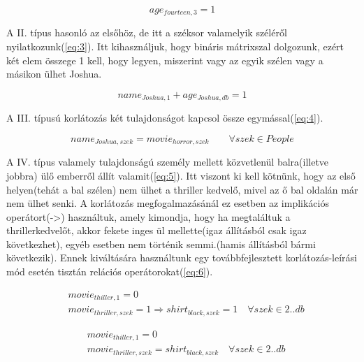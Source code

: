 \documentclass[12pt,a4paper]{report}
\begin{document}
    \begin{equation} \label{eq:2}
     age_ {fourteen,3}=1 
     \end{equation}

    A II. típus hasonló az elsőhöz, de itt a széksor valamelyik széléről nyilatkozunk(\ref{eq:3}).
    Itt kihasználjuk, hogy bináris mátrixszal dolgozunk, ezért két elem összege 1 kell, hogy legyen, miszerint vagy az egyik szélen vagy a másikon ülhet Joshua.

    \begin{equation}  \label{eq:3}
    name_{Joshua,1} + age_{Joshua,db} =1
    \end{equation}

    A III. típusú korlátozás két tulajdonságot kapcsol össze egymással(\ref{eq:4}).

    \begin{equation} \label{eq:4}
    name_{Joshua,szek} = movie_{horror,szek} \qquad \forall szek \in People
    \end{equation}

    A IV. típus valamely tulajdonságú személy mellett közvetlenül balra(illetve jobbra) ülő emberről állít valamit(\ref{eq:5}).
    Itt viszont ki kell kötnünk, hogy az első helyen(tehát a bal szélen) nem ülhet a thriller kedvelő, mivel az ő bal oldalán már nem ülhet senki.
    A korlátozás megfogalmazásánál ez esetben az implikációs operátort(->) használtuk, amely kimondja, hogy ha megtaláltuk a thrillerkedvelőt, akkor fekete inges ül mellette(igaz állításból csak igaz következhet), egyéb esetben nem történik semmi.(hamis állításból bármi következik).
    Ennek kiváltására használtunk egy továbbfejlesztett korlátozás-leírási mód esetén tisztán relációs operátorokat(\ref{eq:6}).

    \begin{equation} \label{eq:5}
    \begin{aligned}
    &movie_{thiller,1}=0 \\
    &movie_{thriller,szek}=1 \Rightarrow shirt_{black,szek}=1 \quad \forall szek \in 2..db
    \end{aligned}
    \end{equation}
    
    \begin{equation} \label{eq:6}
    \begin{aligned}
    &movie_{thiller,1}=0 \\
    &movie_{thriller,szek}= shirt_{black,szek} \quad \forall szek\in 2..db
    \end{aligned}
    \end{equation}
\end{document}
